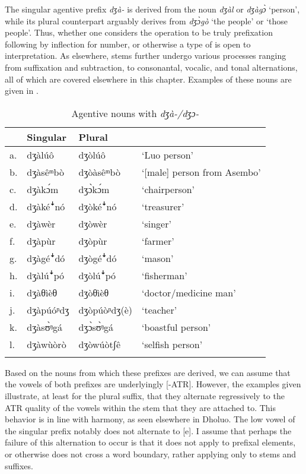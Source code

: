 \documentclass[output=paper,colorlinks,citecolor=brown]{langscibook}
\begin{document}
The singular agentive prefix \textit{dʒà-} is derived from the noun \textit{dʒàl} or \textit{dʒàgɔ̀} `person', while its plural counterpart arguably derives from \textit{dʒɔ̀gò} `the people' or `those people'. Thus, whether one considers the operation to be truly prefixation following by inflection for number, or otherwise a type of  is open to interpretation. As elsewhere, stems further undergo various processes ranging from suffixation and subtraction, to consonantal, vocalic, and tonal alternations, all of which are covered elsewhere in this chapter. Examples of these nouns are given in .

\begin{table}
\caption{Agentive nouns with \textit{dʒà-/dʒɔ-}}
\label{tab:AgentiveDza}
 \begin{tabular}{llll}
  \lsptoprule
& Singular & Plural &  \\
\midrule
a.	&dʒàlúô	&dʒòlúô&	`Luo person'\\
b.&	dʒàsêᵐbò	&dʒòàsêᵐbò&	`[male] person from Asembo'\\
c.&	dʒàkɔ́m	&dʒɔ̀kɔ́m&	`chairperson'\\
d.&	dʒàkéꜜnó &	dʒòkéꜜnó&	`treasurer'\\
e.&	dʒàwèr&	dʒòwèr&	`singer'\\
f.&	dʒàpùr	&dʒòpùr	&`farmer'\\
g.&	dʒàgéꜜdó	&dʒògéꜜdó&	`mason' \\
h.&	dʒàlúꜜpó&	dʒòlúꜜpó&	`fisherman'\\
i.&	dʒàθìèθ	&dʒòθìèθ	&`doctor/medicine man'\\
j.	&dʒàpúóᶮdʒ	&dʒòpúòᶮdʒ(è) &	`teacher'\\
k.	&dʒàsʊ̀ᵑgá&	dʒɔ̀sʊ̀ᵑgá&	`boastful person'\\
l. &	dʒàwùòrò	&dʒòwúòtʃê 	&`selfish person'\\
  \lspbottomrule
 \end{tabular}
\end{table}   

Based on the nouns from which these prefixes are derived, we can assume that the vowels of both prefixes are underlyingly [-ATR]. However, the examples given illustrate, at least for the plural suffix, that they alternate regressively to the ATR quality of the vowels within the stem that they are attached to. This behavior is in line with  harmony, as seen elsewhere in Dholuo. The low vowel of the singular prefix notably does not alternate to [e]. I assume that perhaps the failure of this alternation to occur is that it does not apply to prefixal elements, or otherwise does not cross a word boundary, rather applying only to stems and suffixes.\largerpage[-1]
\end{document}
